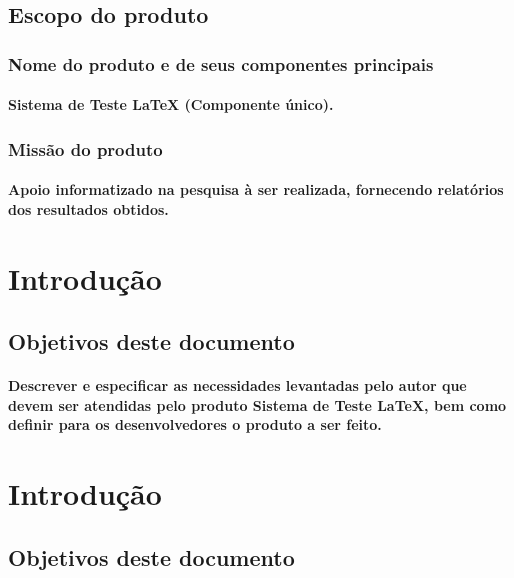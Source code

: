 \documentclass{article}
\begin{document}
	\subsection{Escopo do produto}
		\subsubsection{Nome do produto e de seus componentes principais}
			\paragraph{Sistema de Teste LaTeX (Componente único). }
		\subsubsection{Missão do produto}
			\paragraph{Apoio informatizado na pesquisa à ser realizada, fornecendo relatórios dos resultados obtidos.}
	
		
\newpage

\section{Introdução}
	\subsection{Objetivos deste documento}
		\paragraph{Descrever e especificar as necessidades levantadas pelo autor que devem ser atendidas pelo produto Sistema de Teste LaTeX, bem como definir para os desenvolvedores o produto a ser feito.}


\newpage

\section{Introdução}
	\subsection{Objetivos deste documento}
\end{document}
